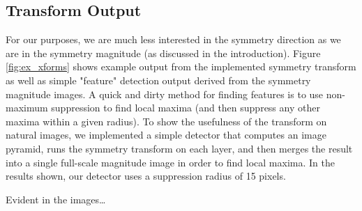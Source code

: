 \subsection{Transform Output}
\label{sec:transform-output}

For our purposes, we are much less interested in the symmetry direction as we are in the symmetry magnitude (as discussed in the introduction). Figure \ref{fig:ex_xforms} shows example output from the implemented symmetry transform as well as simple "feature" detection output derived from the symmetry magnitude images. A quick and dirty method for finding features is to use non-maximum suppression to find local maxima (and then suppress any other maxima within a given radius). To show the usefulness of the transform on natural images, we implemented a simple detector that computes an image pyramid, runs the symmetry transform on each layer, and then merges the result into a single full-scale magnitude image in order to find local maxima. In the results shown, our detector uses a suppression radius of 15 pixels. 

Evident in the images\ldots{}

